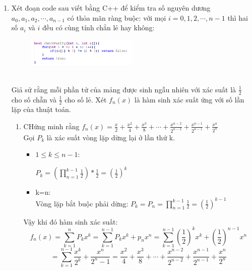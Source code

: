 \documentclass[12pt,a4paper]{article}
\begin{document}
\begin{enumerate}[label=\textbf{Câu 2:} ]
    \item Xét đoạn code sau viết bằng C++ để kiểm tra số nguyên dương $a_{0},a_{1},a_{2},\cdots,a_{n-1} $ có thỏa mãn ràng buộc: với mọi $i=0,1,2,\cdots,n-1 $ thì hai số  $a_{i} $ và $i $ đều có cùng tính chẳn lẻ hay không:
          \begin{figure}[h] %
              \centering
              \includegraphics[width=0.5\textwidth]{image/img2.png} %
              \label{fig:hinh_anh}
          \end{figure}
          \\
          Giả sử rằng mỗi phần tử của mảng được sinh ngẫu nhiên với xác suất là $\frac{1}{2} $ cho số chẵn và $\frac{1}{2}$ cho số lẻ. Xét $f_{n}(x) $ là hàm sinh xác suất ứng với số lần lặp của thuật toán.
          \begin{enumerate}[label=\alph*)]
              \item CHứng minh rằng $f_{n}(x)=\frac{x}{2}+\frac{x^2}{4}+\frac{x^3}{8}+\cdots+\frac{x^{n-2}}{2^{n-2}}+\frac{x^{n-1}}{2^{n-1}}+\frac{x^{n}}{2^{n}}$\\
              Gọi $P_{k} $ là xác suất vòng lặp dừng lại ở lần thứ k.
              \begin{itemize}[label=$\bullet$]
                \item $1 \leq k\leq n-1:$
                \begin{center}
                    $P_{k}=(\prod_{n = 1}^{k-1}\frac{1}{2})*\frac{1}{2}=(\frac{1}{2})^{k}  $
                \end{center}
                \item k=n:\\
                Vòng lặp bắt buộc phải dừng:
                    $P_{k}=P_{n}=\prod_{n = 1}^{k-1}\frac{1}{2}=(\frac{1}{2})^{k-1}$
              \end{itemize}
              Vậy khi đó hàm sinh xác suất:\\
              \[f_{n}(x)=\sum_{k = 1}^{n}P_{k}x^k=\sum_{k = 1}^{n-1}P_{k}x^k+p_{n}x^n=\sum_{k = 1}^{n-1}(\frac{1}{2})^kx^k+(\frac{1}{2})^{n-1}x^n\]
              \[=\sum_{k = 1}^{n-1}\frac{x^k}{2^k}+\frac{x^n}{2^n-1}=\frac{x^2}{4}+\frac{x^3}{8}+\cdots+\frac{x^{n-2}}{2^{n-2}}+\frac{x^{n-1}}{2^{n-1}}+\frac{x^{n}}{2^{n}}\]

\end{enumerate}
\end{enumerate}
\end{document}
